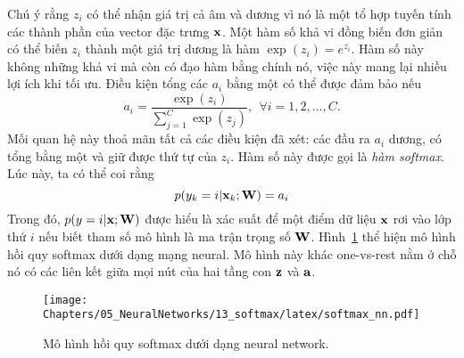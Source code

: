 Chú ý rằng $z_i$ có thể nhận giá trị cả âm và dương vì nó là một tổ hợp tuyến
tính các thành phần của vector đặc trưng $\mathbf{x}$. Một hàm số khả vi đồng biến đơn
giản có thể biến $z_i $ thành một giá trị dương là hàm $\exp(z_i) = e^{z_i}$.
Hàm số này không những khả vi mà còn có đạo hàm bằng chính nó, việc này mang
lại nhiều lợi ích khi tối ưu. Điều kiện tổng các $a_i$ bằng một có
thể được đảm bảo nếu \begin{equation} a_i = \frac{\exp(z_i)}{\sum_{j=1}^C
\exp(z_j)}, ~~ \forall i = 1, 2, \dots, C.
\end{equation}
Mối quan hệ này thoả mãn tất cả các điều kiện đã xét: các đầu ra $a_i$ dương, có
tổng bằng một và giữ được {thứ tự} của $z_i$. Hàm số này được gọi là
\textit{hàm softmax}. Lúc này, ta có thể coi rằng
\begin{equation}
p(y_k = i | \mathbf{x}_k; \mathbf{W}) = a_i
\end{equation}
Trong đó, $p(y = i | \mathbf{x}; \mathbf{W})$ được hiểu là xác suất để một điểm
dữ liệu $\mathbf{x}$ rơi vào lớp thứ $i$ nếu biết tham số mô hình là ma trận
trọng số $\mathbf{W}$.
Hình~\ref{fig:13_2} thể hiện mô hình hồi quy softmax dưới dạng mạng neural. Mô hình này khác one-vs-rest nằm ở chỗ nó có các liên kết giữa mọi nút của hai tầng con $\mathbf{z}$ và $\mathbf{a}$.



\begin{figure}[t]
\centering
\texttt{[image: Chapters/05\_NeuralNetworks/13\_softmax/latex/softmax\_nn.pdf]}
\caption[]{Mô hình hồi quy softmax dưới dạng neural network.}
\label{fig:13_2}
\end{figure}

